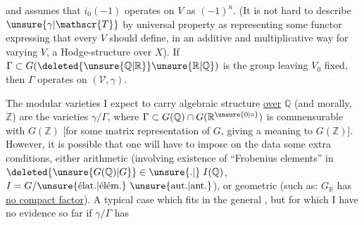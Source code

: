 and assumes that $i_0(-1)$ operates on $V$ as  $(-1)^n$. (It is not hard to describe $\unsure{\gamma|\mathscr{T}}$ by universal property as  representing some functor  expressing that every $V$  should define, in an additive and multiplicative way for varying $V$, a Hodge-structure  over $X$). If $\Gamma\subset G(\deleted{\unsure{\mathbb{Q}|\mathbb{R}}}\unsure{\mathbb{R}|\mathbb{Q}})$ is the group leaving $V_0$ fixed, then $\Gamma$ operates on $(\mathscr{V},\gamma)$.

The modular varieties I expect to carry algebraic structure \uline{over} $\mathbb{Q}$ (and morally, $\mathbb{Z}$) are the varieties $\boxed{\gamma/\Gamma}$, where $\Gamma\subset G(\mathbb{Q})\cap G(\mathbb{R}^{\unsure{0|\circ}})$  is commensurable with $G(\mathbb{Z})$ [for some matrix representation of $G$,  giving a meaning to $G(\mathbb{Z})$]. However, it is possible that one will have to impose on the data some extra conditions, either arithmetic (involving existence of ``Frobenius elements'' in $\deleted{\unsure{G(\mathbb{Q})|G}}\in\unsure{.|{}}\;I(\mathbb{Q})$, $I=G/\text{\unsure{élat.|élém.} \unsure{aut.|ant.}}$), or geometric  (such as: $G_{\mathbb{R}}$ has \uline{no compact factor}). A typical case which fits in the general  , but for which I have no evidence so far if $\gamma/\Gamma$ has
